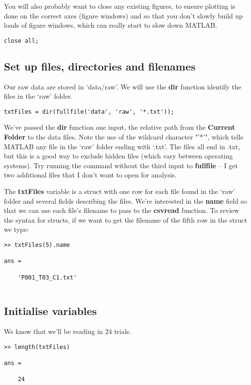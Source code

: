 \documentclass[12pt,a4paper]{article}
\begin{document}
You will also probably want to close any existing figures, to ensure plotting is done on the correct axes (figure windows) and so that you don't slowly build up loads of figure windows, which can really start to slow down MATLAB.

\begin{lstlisting}[style=Matlab-editor]
close all;
\end{lstlisting}

\subsection{Set up files, directories and filenames}
Our raw data are stored in `data/raw'.
We will use the \textbf{dir} function identify the files in the `raw' folder.

\begin{lstlisting}[style=Matlab-editor]
txtFiles = dir(fullfile('data', 'raw', '*.txt'));
\end{lstlisting}

We've passed the \textbf{dir} function one input, the relative path from the \textbf{Current Folder} to the data files.
Note the use of the wildcard character "'*'", which tells MATLAB any file in the `raw' folder ending with `.txt'.
The files all end in .txt, but this is a good way to exclude hidden files (which vary between operating systems).
Try running the command without the third input to \textbf{fullfile} – I get two additional files that I don't want to open for analysis.

The \textbf{txtFiles} variable is a struct with one row for each file found in the `raw' folder and several fields describing the files.
We're interested in the \textbf{name} field so that we can use each file's filename to pass to the \textbf{csvread} function.
To review the syntax for structs, if we want to get the filename of the fifth row in the struct we type:

\begin{lstlisting}[style=Matlab-editor]
>> txtFiles(5).name

ans =

    'P001_T03_C1.txt'
    
\end{lstlisting}

\subsection{Initialise variables}
We know that we'll be reading in 24 trials.
\begin{lstlisting}[style=Matlab-editor]
>> length(txtFiles)

ans =

    24

\end{lstlisting}
\end{document}
